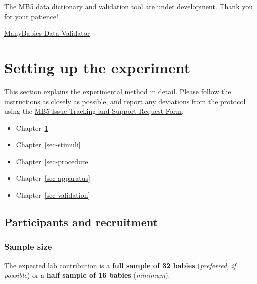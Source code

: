 \documentclass[
  letterpaper,
  DIV=11,
  numbers=noendperiod,
  oneside]{scrreprt}
\providecommand{\tightlist}{%
  \setlength{\itemsep}{0pt}\setlength{\parskip}{0pt}}
\begin{document}
\begin{tcolorbox}[enhanced jigsaw, coltitle=black, colframe=quarto-callout-important-color-frame, titlerule=0mm, colback=white, arc=.35mm, toprule=.15mm, left=2mm, colbacktitle=quarto-callout-important-color!10!white, opacityback=0, bottomtitle=1mm, title=\textcolor{quarto-callout-important-color}{\faExclamation}\hspace{0.5em}{Important}, breakable, rightrule=.15mm, opacitybacktitle=0.6, toptitle=1mm, leftrule=.75mm, bottomrule=.15mm]

The MB5 data dictionary and validation tool are under development. Thank
you for your patience!

\end{tcolorbox}

\href{https://manybabies.org/validator/}{ManyBabies Data Validator}

\part{Setting up the experiment}

This section explains the experimental method in detail. Please follow
the instructions as closely as possible, and report any deviations from
the protocol using the
\href{https://airtable.com/appRoqMKzcK3NsXt4/pagGafhoHcuVMs7ZV/form}{MB5
Issue Tracking and Support Request Form}.

\begin{itemize}
\tightlist
\item
  Chapter~\ref{sec-participants}
\item
  Chapter~\ref{sec-stimuli}
\item
  Chapter~\ref{sec-procedure}
\item
  Chapter~\ref{sec-apparatus}
\item
  Chapter~\ref{sec-validation}
\end{itemize}

\chapter{Participants and recruitment}\label{sec-participants}

\section{Sample size}\label{sample-size}

The expected lab contribution is a \textbf{full sample of 32 babies}
(\emph{preferred, if possible}) or a \textbf{half sample of 16 babies}
(\emph{minimum}).
\end{document}
